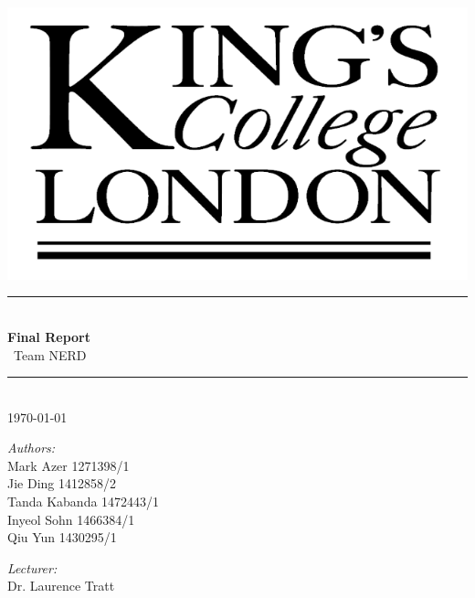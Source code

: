 \documentclass[11pt]{article}
\begin{document}
	\begin{titlepage}
	\center
	\newcommand{\HRule}{\rule{\linewidth}{0.5mm}} 
\includegraphics[scale=0.2]{kingslogo}\\
\HRule \\[0.4cm]
{\huge \bfseries Final Report}\\[0.4cm]
	\ Team NERD
\HRule \\[1.5cm]
{\large \today}\\[10cm] 

\begin{minipage}{0.4\textwidth}
	\begin{flushleft} \large
		\emph{Authors:}\\
			Mark Azer 1271398/1\\
			Jie Ding 1412858/2 \\
			Tanda Kabanda 1472443/1 \\
			Inyeol Sohn 1466384/1 \\
			Qiu Yun 1430295/1 \\
	\end{flushleft}
\end{minipage}
\begin{minipage}{0.4\textwidth}
	\begin{flushright} \large
		\emph{Lecturer:} \\
		Dr. Laurence Tratt
	\end{flushright}
\end{minipage}\\[4cm]
	
	\end{titlepage}
\tableofcontents
\newpage
	
\end{document}
